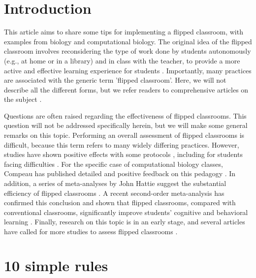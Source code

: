 \documentclass[10pt,letterpaper]{article}
\begin{document}
\section*{Introduction}

This article aims to share some tips for implementing a flipped classroom, with examples from biology and computational biology. 
The original idea of the flipped classroom involves reconsidering the type of work done by students autonomously (e.g., at home or in a library) and in class with the teacher, to provide a more active and effective learning experience for students \cite{bergmann_flip_2012,schell_flipping_2015}. 
Importantly, many practices are associated with the generic term 'flipped classroom'.
Here, we will not describe all the different forms, but we refer readers to comprehensive articles on the subject
\cite{bishop_flipped_2013,lebrun_vers_2016}.

Questions are often raised regarding the effectiveness of flipped classrooms. This question will not be addressed specifically herein, but we will make some general remarks on this topic. Performing an overall assessment of flipped classrooms is difficult, because this term refers to many widely differing practices. However, studies have shown positive effects with some protocols
\cite{casasola_can_2017, crouch_peer_2001, freeman_reply_2014}, including for students facing
difficulties \cite{lage_inverting_2000}. For the specific case of computational biology classes, 
Compeau has published detailed and positive feedback on this pedagogy \cite{compeau_establishing_2019}.
In addition, a series of meta-analyses by John Hattie \cite{hattie2014, hattie2018} suggest the substantial efficiency of flipped classrooms
\cite{chen_academic_2019,hew_flipped_2018,karagol_effect_2019,tan_effectiveness_2017}. 
A recent second-order meta-analysis has confirmed this conclusion and shown that flipped classrooms, compared with conventional classrooms,
significantly improve students’ cognitive and behavioral learning \cite{hew_does_2020}.
Finally, research on this topic is in an early stage, and several articles have called for more studies to assess
flipped classrooms 
\cite{abeysekera_motivation_2015,bishop_flipped_2013,hew_does_2020,lo_critical_2017}.


\section{10 simple rules}
\end{document}
